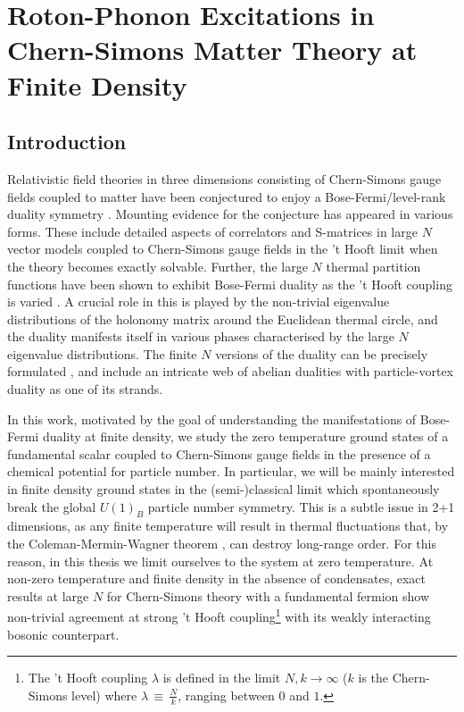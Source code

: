 \chapter{Roton-Phonon Excitations in Chern-Simons Matter Theory at Finite Density}
\label{ch:Chapter_3}
    \graphicspath{{Chapter_3_Folder/figures/PNG/}{Chapter_3_Folder/figures/PDF/}{Chapter_3_Folder/figures/}}

\section{Introduction}
Relativistic field theories in three dimensions consisting of Chern-Simons gauge fields coupled to matter have been conjectured to enjoy a Bose-Fermi/level-rank duality symmetry \cite{Giombi:2011kc}. Mounting evidence for the conjecture has appeared in various forms. These include detailed aspects of  correlators \cite{Giombi:2011kc, Aharony:2011jz, Maldacena:2011jn, Maldacena:2012sf, Aharony:2012nh} and S-matrices \cite{Jain:2014nza, Dandekar:2014era} in large $N$ vector models coupled to Chern-Simons gauge fields in the 't Hooft limit when the theory  becomes exactly solvable. 
Further, the large $N$ thermal partition functions have been shown to exhibit Bose-Fermi duality as the 't Hooft coupling is varied \cite{Giombi:2011kc, Aharony:2012ns,Jain:2013py, Jain:2013gza, Takimi:2013zca}.  A crucial role in this is played by the non-trivial eigenvalue distributions of the holonomy matrix around the Euclidean thermal circle, and the duality manifests itself in various phases characterised by the large $N$ eigenvalue distributions. The  finite $N$ versions of the duality can be precisely formulated \cite{Aharony:2015mjs}, and include an intricate web of abelian dualities \cite{Seiberg:2016gmd, Karch:2016sxi, Murugan:2016zal} with particle-vortex duality as one of its strands.

 In this work, motivated by the goal of understanding the manifestations of Bose-Fermi duality at finite density, we  study the zero temperature ground states of a fundamental scalar coupled to Chern-Simons gauge fields in the presence of a chemical potential for particle number. In particular, we will be mainly interested in finite density ground states in the (semi-)classical limit which spontaneously break the global $U(1)_B$ particle number symmetry. This is a subtle issue in 2+1 dimensions, as any finite temperature will result in thermal fluctuations that, by the Coleman-Mermin-Wagner theorem \cite{Coleman:1973ci, Mermin:1966fe}, can  destroy long-range order. 
 For this reason, in this thesis we limit ourselves to the system at zero temperature. 
 At  non-zero temperature and finite density in the absence of condensates,  exact results at large $N$ for Chern-Simons theory with a fundamental fermion \cite{Geracie:2015drf, Gur-Ari:2016xff} show non-trivial agreement at strong 't Hooft coupling\footnote{The 't Hooft coupling $\lambda$ is defined in the limit $N,k\to\infty$  ($k$ is the Chern-Simons level) where $\lambda \,\equiv\,\frac{N}{k}$, ranging between $0$ and $1$. } with its weakly interacting bosonic counterpart.
 
